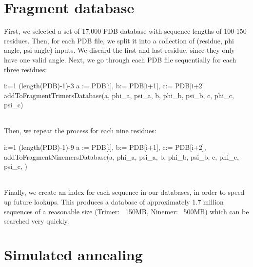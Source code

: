 \documentclass{article}
\begin{document}
\begin{enumerate}
\section{Fragment database}

First, we selected a set of 17,000 PDB database with sequence lengths of 100-150 residues.  Then, for each PDB file, we split it into a collection of (residue, phi angle, psi angle) inputs.  We discard the first and last residue, since they only have one valid angle.  Next, we go through each PDB file sequentially for each three residues:
\begin{program}

  \FOR i:=1 \TO (length(PDB)-1)-3  \DO
	a := PDB[i], b:= PDB[i+1], c:= PDB[i+2]
     	addToFragmentTrimersDatabase(a, phi_a, psi_a, b, phi_b, psi_b, c, phi_c, psi_c)\\\\
\END
\end{program}

Then, we repeat the process for each nine residues:

\begin{program}
  \FOR i:=1 \TO (length(PDB)-1)-9  \DO
	a := PDB[i], b:= PDB[i+1], c:= PDB[i+2],  \dotso
	addToFragmentNinemersDatabase(a, phi_a, psi_a, b, phi_b, psi_b, c, phi_c, psi_c, \dotso)\\\\
\END
\end{program}

Finally, we create an index for each sequence in our databases, in order to speed up future lookups.  This produces a database of approximately 1.7 million sequences of a reasonable size (Trimer: ~150MB, Ninemer: ~500MB) which can be searched very quickly.

\section{Simulated annealing}




\end{enumerate}
\end{document}
